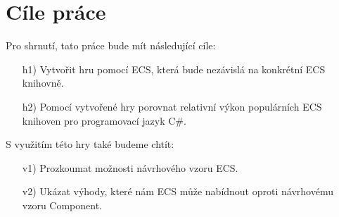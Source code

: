 \section{Cíle práce}
Pro shrnutí, tato práce bude mít následující cíle:
\begin{enumerate}
    \item[h1)] Vytvořit hru pomocí ECS, která bude nezávislá na konkrétní ECS knihovně.
    \item[h2)] Pomocí vytvořené hry porovnat relativní výkon populárních ECS knihoven pro programovací jazyk C\#.
\end{enumerate}
S využitím této hry také budeme chtít:
\begin{enumerate}
    \item[v1)] Prozkoumat možnosti návrhového vzoru ECS.
    \item[v2)] Ukázat výhody, které nám ECS může nabídnout oproti návrhovému vzoru Component.
\end{enumerate}














\iffalse
\chapwithtoc{Introduction}

Introduction should answer the following questions, ideally in this order:
\begin{enumerate}
\item What is the nature of the problem the thesis is addressing?
\item What is the common approach for solving that problem now?
\item How this thesis approaches the problem?
\item What are the results? Did something improve?
\item What can the reader expect in the individual chapters of the thesis?
\end{enumerate}

Expected length of the introduction is between 1--4 pages. Longer introductions may require sub-sectioning with appropriate headings --- use \texttt{\textbackslash{}section*} to avoid numbering (with section names like `Motivation' and `Related work'), but try to avoid lengthy discussion of anything specific. Any ``real science'' (definitions, theorems, methods, data) should go into other chapters.
\todo{You may notice that this paragraph briefly shows different ``types'' of `quotes' in TeX, and the usage difference between a hyphen (-), en-dash (--) and em-dash (---).}

It is very advisable to skim through a book about scientific English writing before starting the thesis. I can recommend `\citetitle{glasman2010science}' by \citet{glasman2010science}.
\fi